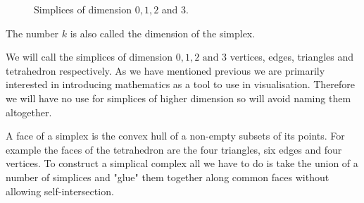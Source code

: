 \begin{figure}[h]

    \caption{Simplices of dimension $0, 1, 2$ and $3$.}%
    \label{fig:example}%
\end{figure}

The number $k$ is also called the dimension of the simplex.

We will call the simplices of dimension $0, 1, 2 \text{ and } 3$ vertices, edges, triangles and tetrahedron respectively. As we have mentioned previous we are primarily interested in introducing mathematics as a tool to use in visualisation. Therefore we will have no use for simplices of higher dimension so will avoid naming them altogether.

A face of a simplex is the convex hull of a non-empty subsets of its points. For example the faces of the tetrahedron are the four triangles, six edges and four vertices. To construct a simplical complex all we have to do is take the union of a number of simplices  and "glue" them together along common faces without allowing self-intersection.

